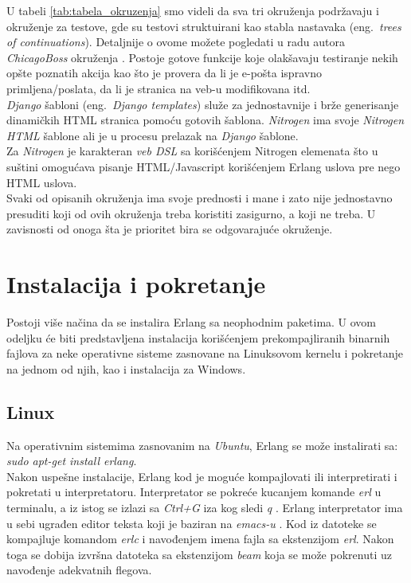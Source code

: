\documentclass[a4paper]{article}
\begin{document}
{U tabeli \ref{tab:tabela_okruzenja} smo videli da sva tri okruženja podržavaju i okruženje za testove, gde su testovi struktuirani kao stabla nastavaka (eng.~{\em trees of continuations}). Detaljnije o ovome možete pogledati u radu autora {\em ChicagoBoss} okruženja \cite{EvanMillerTesting}. Postoje gotove funkcije koje olakšavaju testiranje nekih opšte poznatih akcija kao što je provera da li je e-pošta ispravno primljena/poslata, da li je stranica na veb-u modifikovana itd. \\

{\em Django} šabloni (eng.~{\em Django templates}) \cite{DjangoTempDoc} služe za jednostavnije i brže generisanje dinamičkih HTML stranica pomoću gotovih šablona. {\em Nitrogen} ima svoje {\em Nitrogen HTML} šablone ali je u procesu prelazak na {\em Django} šablone. \\

Za {\em Nitrogen} \cite{NitrogenDocumentation} je karakteran {\em veb DSL} \cite{WebDSL} sa korišćenjem Nitrogen elemenata \cite{NitrogenDocumentation} što u suštini omogućava pisanje HTML/Javascript korišćenjem Erlang uslova pre nego HTML uslova. \\

Svaki od opisanih okruženja ima svoje prednosti i mane i zato nije jednostavno presuditi koji od ovih okruženja treba koristiti zasigurno, a koji ne treba. U zavisnosti od onoga šta je prioritet bira se odgovarajuće okruženje.

\section{Instalacija i pokretanje}
\label{sec:instalacija}

Postoji više načina da se instalira Erlang sa neophodnim paketima.
U ovom odeljku će biti predstavljena instalacija korišćenjem prekompajliranih binarnih fajlova 
za neke operativne sisteme zasnovane na Linuksovom kernelu i pokretanje na jednom od njih, kao i instalacija za Windows.

\subsection{Linux}
\label{subsec:instalacijaLinux}

Na operativnim sistemima zasnovanim na {\em Ubuntu}, Erlang se može instalirati sa:
{\em sudo apt-get install erlang}. \\

Nakon uspešne instalacije, Erlang kod je moguće kompajlovati
ili interpretirati i pokretati u interpretatoru.
Interpretator se pokreće kucanjem komande {\em erl} u terminalu, a iz istog
se izlazi sa {\em Ctrl+G} iza kog sledi {\em q} \cite{book_joe}.
Erlang interpretator ima u sebi ugrađen editor teksta koji je baziran na {\em emacs-u} \cite{book_fred}.
Kod iz datoteke se kompajluje komandom {\em erlc} i navođenjem imena fajla sa ekstenzijom {\em erl}.
Nakon toga se dobija izvršna datoteka sa ekstenzijom {\em beam} koja se može
pokrenuti uz navođenje adekvatnih flegova. 

}
\end{document}
